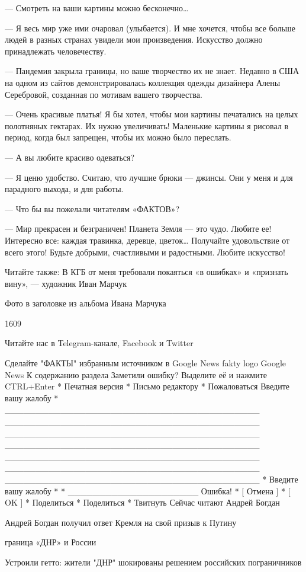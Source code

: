 — Смотреть на ваши картины можно бесконечно…

— Я весь мир уже ими очаровал (улыбается). И мне хочется, чтобы все больше
людей в разных странах увидели мои произведения. Искусство должно
принадлежать человечеству.

— Пандемия закрыла границы, но ваше творчество их не знает. Недавно в США
на одном из сайтов демонстрировалась коллекция одежды дизайнера Алены
Серебровой, созданная по мотивам вашего творчества.

— Очень красивые платья! Я бы хотел, чтобы мои картины печатались на целых
полотняных гектарах. Их нужно увеличивать! Маленькие картины я рисовал
в период, когда был запрещен, чтобы их можно было переслать.

— А вы любите красиво одеваться?

— Я ценю удобство. Считаю, что лучшие брюки — джинсы. Они у меня и для
парадного выхода, и для работы.

— Что бы вы пожелали читателям «ФАКТОВ»?

— Мир прекрасен и безграничен! Планета Земля — это чудо. Любите ее!
Интересно все: каждая травинка, деревце, цветок… Получайте удовольствие
от всего этого! Будьте добрыми, счастливыми и радостными. Любите
искусство!

Читайте также: В КГБ от меня требовали покаяться «в ошибках» и «признать
вину», — художник Иван Марчук

Фото в заголовке из альбома Ивана Марчука

1609

Читайте нас в Telegram-канале, Facebook и Twitter

Сделайте "ФАКТЫ"
избранным источником в Google News
fakty logo
Google News
К содержанию раздела Заметили ошибку? Выделите её и нажмите CTRL+Enter
* Печатная версия
* Письмо редактору
* Пожаловаться
Введите вашу жалобу
* _________________________________________
_________________________________________
_________________________________________
_________________________________________
_________________________________________
_________________________________________
_________________________________________
* Введите вашу жалобу
* * _____________________ Ошибка!
* [ Отмена ]
* [ OK ]
*   Поделиться
*   Поделиться
*   Твитнуть
Сейчас читают
Андрей Богдан

Андрей Богдан получил ответ Кремля на свой призыв к Путину

граница «ДНР» и России

Устроили гетто: жители "ДНР" шокированы решением российских пограничников

